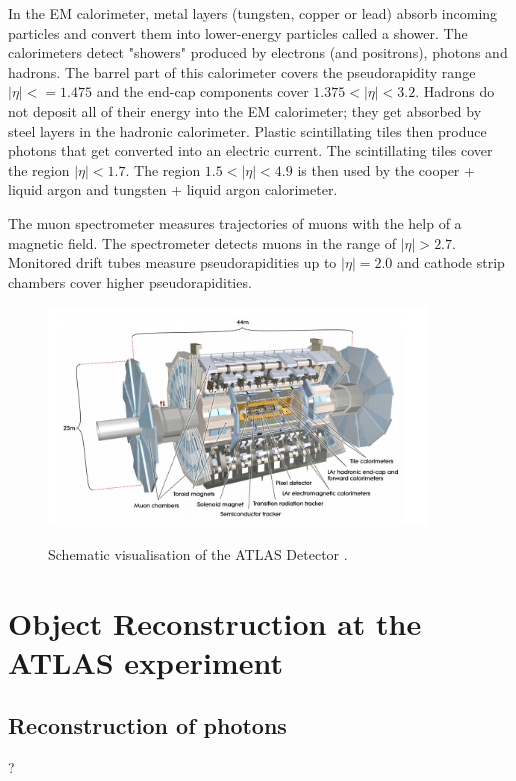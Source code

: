 In the EM calorimeter, metal layers (tungsten, copper or lead) absorb incoming particles and convert them into lower-energy particles called a shower. The calorimeters detect "showers" produced by electrons (and positrons), photons and hadrons. The barrel part of this calorimeter covers the pseudorapidity range $|\eta| < = 1.475$ and the end-cap components cover $1.375 <|\eta|< 3.2$.
Hadrons do not deposit all of their energy into the EM calorimeter; they get absorbed by steel layers in the hadronic calorimeter. 
Plastic scintillating tiles then produce photons that get converted into an electric current. The scintillating tiles cover the region $|\eta| < 1.7$. The region $1.5 < |\eta| < 4.9$ is then used by the cooper + liquid argon and tungsten + liquid argon calorimeter.

The muon spectrometer measures trajectories of muons with the help of a magnetic field. The spectrometer detects muons in the range of $\bigl|\eta\bigr| > 2.7$. 
Monitored drift tubes measure pseudorapidities up to $|\eta| = 2.0$ and cathode strip chambers cover higher pseudorapidities.  
\begin{figure}
    \centering
    \includegraphics[width=0.9\textwidth]{Plots/atlasSCHEMA.PNG}
    \label{fig:atlasschema}
    \caption{Schematic visualisation of the ATLAS Detector \cite{Collaboration_2008}.}
\end{figure}



\section{Object Reconstruction at the ATLAS experiment}

\subsection{Reconstruction of photons}
\label{sec:reconphoton}
?
